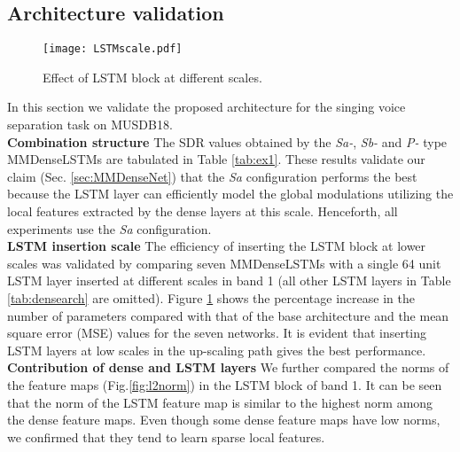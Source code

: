 \documentclass{article}
\begin{document}
\subsection{Architecture validation}
\label{sec:arcvalid}
\begin{figure}[t]
\centering
\texttt{[image: LSTMscale.pdf]}
\caption{Effect of LSTM block at different scales.}
\label{fig:lstmpos}
\end{figure}

\begin{table}[t]
\caption{\label{tab:ex1} {\it Comparison of MMDenseLSTM configurations.}}
\vspace{2mm}
\end{table}  
In this section we validate the proposed architecture for the singing voice separation task on MUSDB18.\\
\textbf{Combination structure} \hspace{2mm} The SDR values obtained by the \textit{Sa-}, \textit{Sb-} and \textit{P-} type MMDenseLSTMs are tabulated in Table \ref{tab:ex1}. These results validate our claim (Sec. \ref{sec:MMDenseNet}) that the \textit{Sa} configuration performs the best because the LSTM layer can efficiently model the global modulations utilizing the local features extracted by the dense layers at this scale. Henceforth, all experiments use the \textit{Sa} configuration.\vspace{1mm}\\
\textbf{LSTM insertion scale} \hspace{3mm} The efficiency of inserting the LSTM block at lower scales was validated by comparing seven MMDenseLSTMs with a single 64 unit LSTM layer inserted at different scales in band 1 (all other LSTM layers in Table \ref{tab:densearch} are omitted). Figure \ref{fig:lstmpos} shows the percentage increase in the number of parameters compared with that of the base architecture and the mean square error (MSE) values for the seven networks. It is evident that inserting LSTM layers at low scales in the up-scaling path gives the best performance.\vspace{1mm}\\
\textbf{Contribution of dense and LSTM layers} \hspace{3mm} We further compared the  norms of the feature maps (Fig.\ref{fig:l2norm}) in the LSTM block  of band 1. It can be seen that the norm of the LSTM feature map is similar to the highest norm among the dense feature maps. Even though some dense feature maps have low norms, we confirmed that they tend to learn sparse local features.
\end{document}
